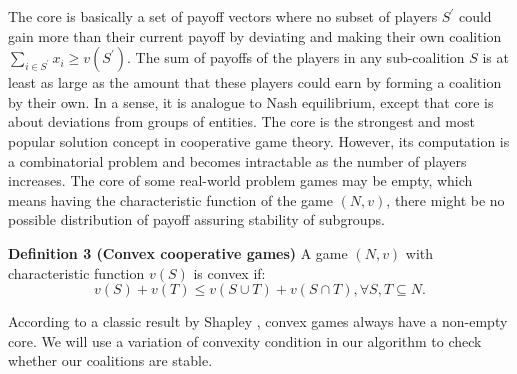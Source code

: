             The core is basically a set of payoff vectors where no subset of
            players $S^\prime$ could gain more than their current payoff by
            deviating and making their own coalition $\sum_{i \in S^\prime}
            x_i \geq v(S^\prime)$. The sum of payoffs of the players in any
            sub-coalition $S$ is at least as large as the amount that these
            players could earn by forming a coalition by their own. In a
            sense, it is analogue to Nash equilibrium, except that core is
            about deviations from groups of entities. The core is the
            strongest and most popular solution concept in cooperative game
            theory. However, its computation is a combinatorial problem and
            becomes intractable as the number of players increases. The core
            of some real-world problem games may be empty, which means having
            the characteristic function of the game $(N,v)$, there might be no
            possible distribution of payoff assuring stability of subgroups.

            {\bf Definition 3 (Convex cooperative games)} A game $(N,v)$ with
            characteristic function $v(S)$ is convex if:
            \begin{equation}\label{eq:convex}
            v(S) + v(T) \leq v(S \cup T) + v (S \cap T), \forall S,T \subseteq
            N.
            \end{equation}

            According to a classic result by Shapley \cite{S1971cores}, convex
            games always have a non-empty core. We will use a variation of
            convexity condition in our algorithm to check whether our
            coalitions are stable.

%

